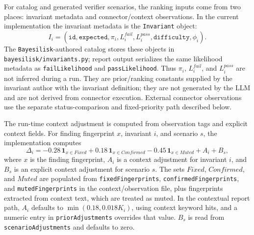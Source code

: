 \documentclass[10pt]{article}
\newcommand{\tool}{\texttt{Bayesilisk}\xspace}
\begin{document}
For catalog and generated verifier scenarios, the ranking inputs come from two
places: invariant metadata and connector/context observations. In the current
implementation the invariant metadata is the \texttt{Invariant} object:
\[
  I_i =
  (\texttt{id},\texttt{expected},\pi_i,L_i^{fail},L_i^{pass},
   \texttt{difficulty},\phi_i).
\]
The \tool-authored catalog stores these objects in
\texttt{bayesilisk/invariants.py}; report output serializes the same likelihood
metadata as \texttt{failLikelihood} and \texttt{passLikelihood}. Thus
\(\pi_i\), \(L_i^{fail}\), and \(L_i^{pass}\) are not inferred during a run.
They are prior/ranking constants supplied by the invariant author with the
invariant definition; they are not generated by the LLM and are not derived from
connector execution. External connector observations use the separate
status-comparison and fixed-priority path described below.

The run-time context adjustment is computed from observation tags and explicit
context fields. For finding fingerprint \(x\), invariant \(i\), and scenario
\(s\), the implementation computes
\[
  \Delta_i =
  -0.28\,\mathbf{1}_{x\in Fixed}
  +0.18\,\mathbf{1}_{x\in Confirmed}
  -0.45\,\mathbf{1}_{x\in Muted}
  +A_i+B_s,
\]
where \(x\) is the finding fingerprint, \(A_i\) is a context adjustment for
invariant \(i\), and \(B_s\) is an explicit context adjustment for scenario
\(s\). The sets
\(Fixed\), \(Confirmed\), and \(Muted\) are populated from
\texttt{fixedFingerprints}, \texttt{confirmedFingerprints}, and
\texttt{mutedFingerprints} in the context/observation file, plus fingerprints
extracted from context text, which are treated as muted. In the contextual
report path, \(A_i\) defaults to \(\min(0.18,0.018K_i)\), using context keyword
hits, and a numeric entry in \texttt{priorAdjustments} overrides that value.
\(B_s\) is read from \texttt{scenarioAdjustments} and defaults to zero.
\end{document}
